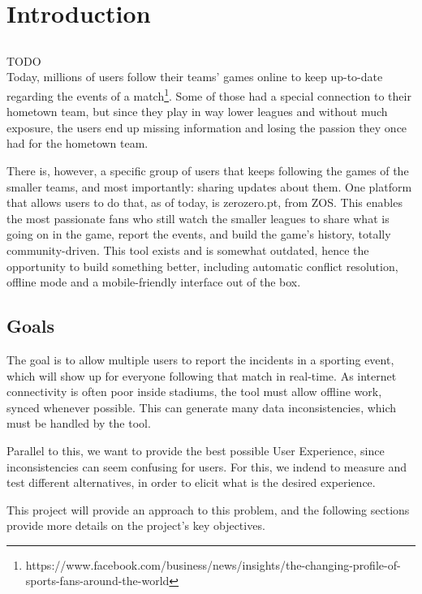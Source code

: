 \chapter{Introduction} \label{chap:intro}

\section*{}

{\Huge TODO} \\


Today, millions of users follow their teams' games online to keep up-to-date regarding the events of a match\footnote{https://www.facebook.com/business/news/insights/the-changing-profile-of-sports-fans-around-the-world}. Some of those had a special connection to their hometown team, but since they play in way lower leagues and without much exposure, the users end up missing information and losing the passion they once had for the hometown team.

There is, however,  a specific group of users that keeps following the games of the smaller teams, and most importantly: sharing updates about them. One platform that allows users to do that, as of today, is zerozero.pt, from ZOS. This enables the most passionate fans who still watch the smaller leagues to share what is going on in the game, report the events, and build the game's history, totally community-driven. This tool exists and is somewhat outdated, hence the opportunity to build something better, including automatic conflict resolution, offline mode and a mobile-friendly interface out of the box.

\section{Goals}
The goal is to allow multiple users to report the incidents in a sporting event, which will show up for everyone following that match in real-time. As internet connectivity is often poor inside stadiums, the tool must allow offline work, synced whenever possible. This can generate many data inconsistencies, which must be handled by the tool.

Parallel to this, we want to provide the best possible User Experience, since inconsistencies can seem confusing for users. For this, we indend to measure and test different alternatives, in order to elicit what is the desired experience. 

This project will provide an approach to this problem, and the following sections provide more details on the project's key objectives.

